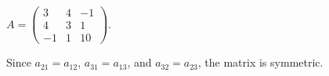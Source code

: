 \documentclass{ximera}
\begin{document}
\begin{exercise} \label{c1.1.01e}
 $A = \left( \begin{array}{rrr}
 3 & 4 & -1\\
 4 & 3 &  1\\
 -1 & 1 & 10\end{array} \right)$.
  \begin{multipleChoice}
  \end{multipleChoice}
       

\begin{solution}
Since $a_{21} = a_{12}$, $a_{31} = a_{13}$, and $a_{32} = a_{23}$, the matrix is symmetric.

\end{solution}
\end{exercise}
\end{document}
